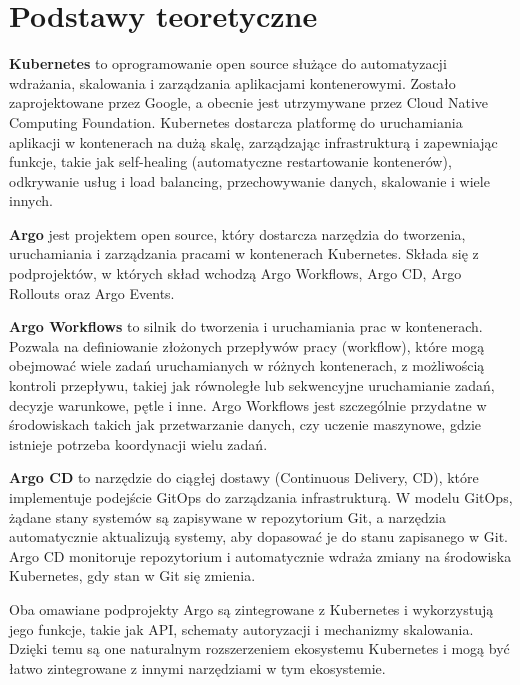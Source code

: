 \documentclass{article}
\begin{document}
\section{Podstawy teoretyczne}
\begin{description}
\item{\textbf{Kubernetes}\cite{kubernetes}} to oprogramowanie open source służące do automatyzacji wdrażania, skalowania i zarządzania aplikacjami kontenerowymi. Zostało zaprojektowane przez Google, a obecnie jest utrzymywane przez Cloud Native Computing Foundation. Kubernetes dostarcza platformę do uruchamiania aplikacji w kontenerach na dużą skalę, zarządzając infrastrukturą i zapewniając funkcje, takie jak self-healing (automatyczne restartowanie kontenerów), odkrywanie usług i load balancing, przechowywanie danych, skalowanie i wiele innych.

\item{\textbf{Argo}\cite{argo}} jest projektem open source, który dostarcza narzędzia do tworzenia, uruchamiania i zarządzania pracami w kontenerach Kubernetes. Składa się z podprojektów, w których skład wchodzą Argo Workflows, Argo CD, Argo Rollouts oraz Argo Events.

\item{\textbf{Argo Workflows}\cite{argo-workflows}} to silnik do tworzenia i uruchamiania prac w kontenerach. Pozwala na definiowanie złożonych przepływów pracy (workflow), które mogą obejmować wiele zadań uruchamianych w różnych kontenerach, z możliwością kontroli przepływu, takiej jak równoległe lub sekwencyjne uruchamianie zadań, decyzje warunkowe, pętle i inne. Argo Workflows jest szczególnie przydatne w środowiskach takich jak przetwarzanie danych, czy uczenie maszynowe, gdzie istnieje potrzeba koordynacji wielu zadań.

\item{\textbf{Argo CD}\cite{argo-cd}} to narzędzie do ciągłej dostawy (Continuous Delivery, CD), które implementuje podejście GitOps do zarządzania infrastrukturą. W modelu GitOps, żądane stany systemów są zapisywane w repozytorium Git, a narzędzia automatycznie aktualizują systemy, aby dopasować je do stanu zapisanego w Git. Argo CD monitoruje repozytorium i automatycznie wdraża zmiany na środowiska Kubernetes, gdy stan w Git się zmienia.
\end{description}

Oba omawiane podprojekty Argo są zintegrowane z Kubernetes i wykorzystują jego funkcje, takie jak API, schematy autoryzacji i mechanizmy skalowania. Dzięki temu są one naturalnym rozszerzeniem ekosystemu Kubernetes i mogą być łatwo zintegrowane z innymi narzędziami w tym ekosystemie.
\end{document}
